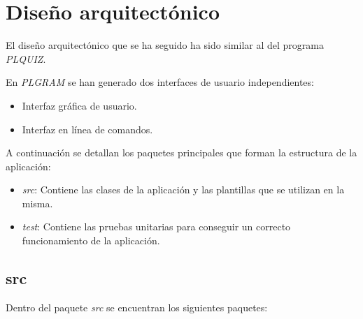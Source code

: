 \section{Diseño arquitectónico}

El diseño arquitectónico que se ha seguido ha sido similar al del programa \textit{PLQUIZ}.

En \textit{PLGRAM} se han generado dos interfaces de usuario independientes: 
\begin{itemize}
\item Interfaz gráfica de usuario. 
\item Interfaz en línea de comandos. 
\end{itemize}

A continuación se detallan los paquetes principales que forman la estructura de la aplicación:

\begin{itemize}
\item \textit{src}: Contiene las clases de la aplicación y las plantillas que se utilizan en la misma. 
\item \textit{test}: Contiene las pruebas unitarias para conseguir un correcto funcionamiento de la aplicación.
\end{itemize}

\subsection{src}

Dentro del paquete \textit{src} se encuentran los siguientes paquetes:

